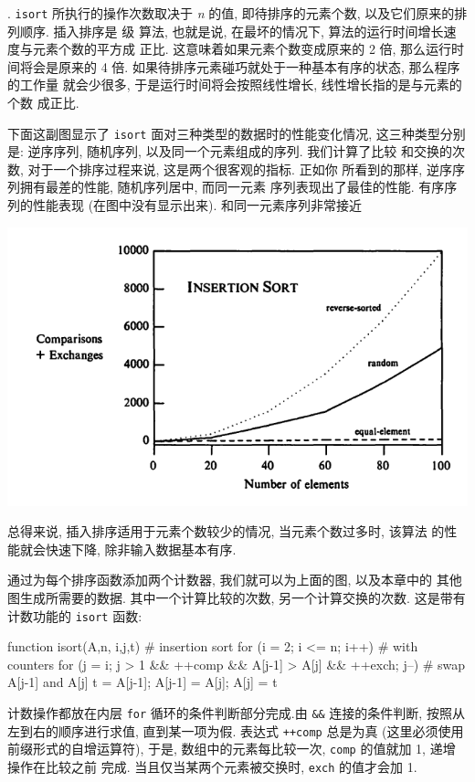 . \texttt{isort} 所执行的操作次数取决于 \textit{n} 的值,
即待排序的元素个数, 以及它们原来的排列顺序. 插入排序是  级
算法, 也就是说, 在最坏的情况下, 算法的运行时间增长速度与元素个数的平方成
正比. 这意味着如果元素个数变成原来的 2 倍, 那么运行时间将会是原来的
4 倍. 如果待排序元素碰巧就处于一种基本有序的状态, 那么程序的工作量
就会少很多, 于是运行时间将会按照线性增长, 线性增长指的是与元素的个数
成正比.

下面这副图显示了 \texttt{isort} 面对三种类型的数据时的性能变化情况, 
这三种类型分别是: 逆序序列, 随机序列, 以及同一个元素组成的序列. 
我们计算了比较
和交换的次数, 对于一个排序过程来说, 这是两个很客观的指标. 正如你
所看到的那样, 逆序序列拥有最差的性能, 随机序列居中, 而同一元素
序列表现出了最佳的性能. 有序序列的性能表现 (在图中没有显示出来). 
和同一元素序列非常接近


\begin{center}
    \includegraphics[scale=0.7]{./images/insertion_sort.png}
\end{center}

总得来说, 插入排序适用于元素个数较少的情况, 当元素个数过多时, 该算法
的性能就会快速下降, 除非输入数据基本有序.

通过为每个排序函数添加两个计数器, 我们就可以为上面的图, 以及本章中的
其他图生成所需要的数据. 其中一个计算比较的次数, 另一个计算交换的次数.
这是带有计数功能的 \texttt{isort} 函数:
\begin{awkcode}
    function isort(A,n,     i,j,t) {  # insertion sort
        for (i = 2; i <= n; i++)      # with counters
            for (j = i; j > 1 && ++comp &&
              A[j-1] > A[j] && ++exch; j--) {
                # swap A[j-1] and A[j]
                t = A[j-1]; A[j-1] = A[j]; A[j] = t
            }
    }
\end{awkcode}
计数操作都放在内层 \texttt{for} 循环的条件判断部分完成.由 \verb'&&' 
连接的条件判断, 按照从左到右的顺序进行求值, 直到某一项为假. 表达式
\texttt{++comp} 总是为真 (这里必须使用前缀形式的自增运算符), 于是,
数组中的元素每比较一次, \texttt{comp} 的值就加 1, 递增操作在比较之前
完成. 当且仅当某两个元素被交换时, \texttt{exch} 的值才会加 1.

